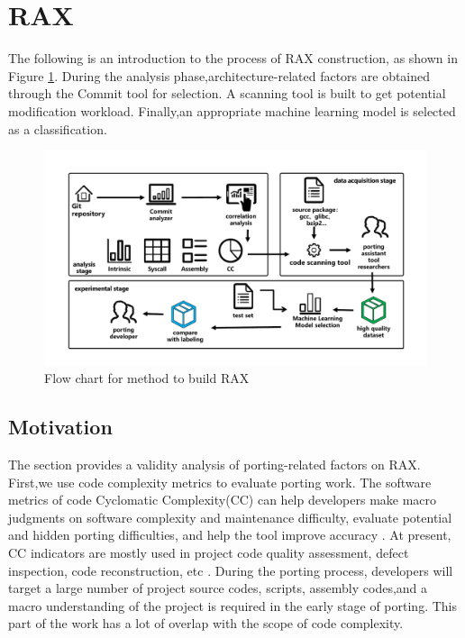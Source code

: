 \documentclass[sigconf,screen,review]{acmart}
\begin{document}
\section{RAX}
The following is an introduction to the process of RAX construction, as shown in Figure \ref{fig:flow-chart}.
During the analysis phase,architecture-related factors are obtained through the Commit tool for selection.
A scanning tool is built to get potential modification workload.
Finally,an appropriate machine learning model is selected as a classification.

\begin{figure}
  \centering
  \includegraphics[width=\linewidth]{flow-chart.pdf}
  \caption{Flow chart for method to build RAX}
  \label{fig:flow-chart}
\end{figure}

\subsection{Motivation}
The section provides a validity analysis of porting-related factors on RAX.
First,we use code complexity metrics to evaluate porting work.
The software metrics of code Cyclomatic Complexity(CC) can help developers make macro judgments on software complexity and maintenance difficulty, evaluate potential and hidden porting difficulties, and help the tool improve accuracy \cite{2005Exploring}.
At present, CC indicators are mostly used in project code quality assessment, defect inspection, code reconstruction, etc \cite{1991Cyclomatic}.
During the porting process, developers will target a large number of project source codes, scripts, assembly codes,and a macro understanding of the project is required in the early stage of porting.
This part of the work has a lot of overlap with the scope of code complexity.
\end{document}
